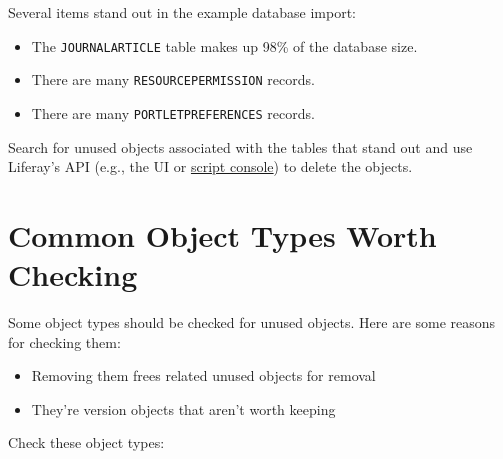 Several items stand out in the example database import:

\begin{itemize}
\tightlist
\item
  The \texttt{JOURNALARTICLE} table makes up 98\% of the database size.
\item
  There are many \texttt{RESOURCEPERMISSION} records.
\item
  There are many \texttt{PORTLETPREFERENCES} records.
\end{itemize}

Search for unused objects associated with the tables that stand out and
use Liferay's API (e.g., the UI or
\href{/docs/7-2/user/-/knowledge_base/u/running-scripts-from-the-script-console}{script
console}) to delete the objects.

\section{Common Object Types Worth
Checking}\label{common-object-types-worth-checking}

Some object types should be checked for unused objects. Here are some
reasons for checking them:

\begin{itemize}
\tightlist
\item
  Removing them frees related unused objects for removal
\item
  They're version objects that aren't worth keeping
\end{itemize}

Check these object types:

